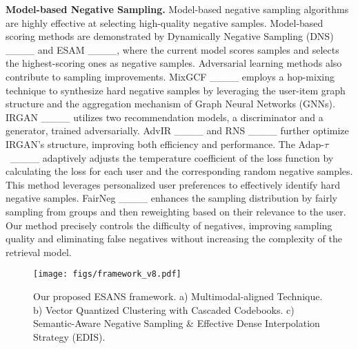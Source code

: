 \noindent \textbf{Model-based Negative Sampling.}
Model-based negative sampling algorithms are highly effective at selecting high-quality negative samples. Model-based scoring methods are demonstrated by Dynamically Negative Sampling (DNS) ____ and ESAM ____, where the current model scores samples and selects the highest-scoring ones as negative samples. Adversarial learning methods also contribute to sampling improvements. 
MixGCF ____ employs a hop-mixing technique to synthesize hard negative samples by leveraging the user-item graph structure and the aggregation mechanism of Graph Neural Networks (GNNs). IRGAN ____ utilizes two recommendation models, a discriminator and a generator, trained adversarially. AdvIR ____ and RNS ____ further optimize IRGAN's structure, improving both efficiency and performance. The Adap-$\tau$\ ____ adaptively adjusts the temperature coefficient of the loss function by calculating the loss for each user and the corresponding random negative samples. This method leverages personalized user preferences to effectively identify hard negative samples. FairNeg ____ enhances the sampling distribution by fairly sampling from groups and then reweighting based on their relevance to the user. Our method precisely controls the difficulty of negatives, improving sampling quality and eliminating false negatives without increasing the complexity of the retrieval model.


\begin{figure*}[htbp]
  \texttt{[image: figs/framework\_v8.pdf]}
  \caption{Our proposed ESANS framework. a) Multimodal-aligned Technique. b) Vector Quantized Clustering with Cascaded Codebooks. c) Semantic-Aware Negative Sampling \& Effective Dense Interpolation Strategy (EDIS).}
  \label{fig:frameworkb}
\end{figure*}